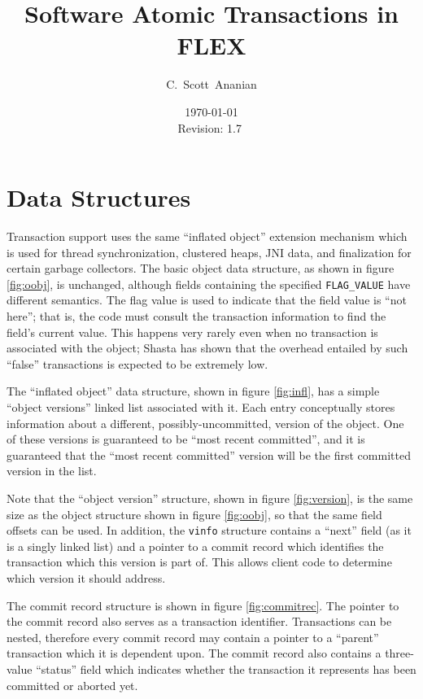 \documentclass[11pt,notitlepage]{article}
\author{C.~Scott~Ananian}
\title{Software Atomic Transactions in FLEX}
\date{\today \\ $ $Revision: 1.7 $ $}
\begin{document}

\maketitle
\section{Data Structures}

Transaction support uses the same ``inflated object'' extension
mechanism which is used for thread synchronization, clustered heaps,
JNI data, and finalization for certain garbage collectors.
The basic object data structure, as shown in figure \ref{fig:oobj}, is
unchanged, although fields containing the specified
\texttt{FLAG\_VALUE} have different semantics.  The flag value is used
to indicate that the field value is ``not here''; that is, the code
must consult the transaction information to find the field's current
value.  This happens very rarely even when no transaction is
associated with the object; Shasta \cite{scales96:shasta} has shown that the
overhead entailed by such ``false'' transactions is expected to be
extremely low.

The ``inflated object'' data structure, shown in figure
\ref{fig:infl}, has a simple ``object versions'' linked list associated with
it.  Each entry conceptually stores information about a different,
possibly-uncommitted, version of the object.  One of these versions is
guaranteed to be ``most recent committed'', and it is guaranteed that
the ``most recent committed'' version will be the first committed
version in the list.

Note that the ``object version'' structure, shown in figure
\ref{fig:version}, is the same size as the object structure shown in
figure \ref{fig:oobj}, so that the same field offsets can be used.
In addition, the \texttt{vinfo} structure contains a ``next'' field
(as it is a singly linked list) and a pointer to a commit record which
identifies the transaction which this version is part of.  This allows
client code to determine which version it should address.

The commit record structure is shown in figure \ref{fig:commitrec}.
The pointer to the commit record also serves as a transaction
identifier.  Transactions can be nested, therefore every commit record
may contain a pointer to a ``parent'' transaction which it is
dependent upon.  The commit record also contains a three-value
``status'' field which indicates whether the transaction it represents
has been committed or aborted yet.
\end{document}
